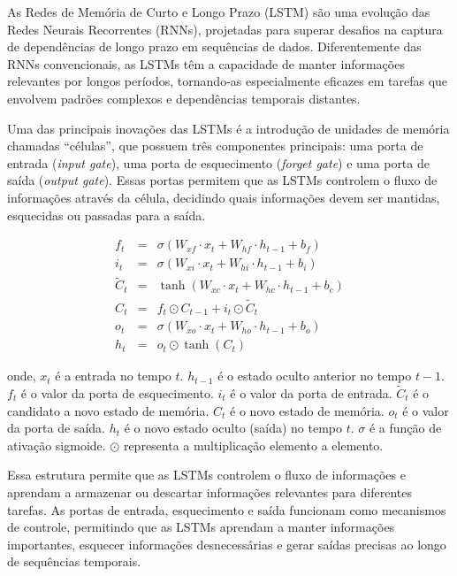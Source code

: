 As Redes de Memória de Curto e Longo Prazo (LSTM) são uma evolução das Redes Neurais Recorrentes (RNNs), projetadas para superar desafios na captura de dependências de longo prazo em sequências de dados. Diferentemente das RNNs convencionais, as LSTMs têm a capacidade de manter informações relevantes por longos períodos, tornando-as especialmente eficazes em tarefas que envolvem padrões complexos e dependências temporais distantes.

Uma das principais inovações das LSTMs é a introdução de unidades de memória chamadas ``células'', que possuem três componentes principais: uma porta de entrada (\textit{input gate}), uma porta de esquecimento (\textit{forget gate}) e uma porta de saída (\textit{output gate}). Essas portas permitem que as LSTMs controlem o fluxo de informações através da célula, decidindo quais informações devem ser mantidas, esquecidas ou passadas para a saída.



\begin{eqnarray}
	f_t &=& \sigma(W_{xf} \cdot x_t + W_{hf} \cdot h_{t-1} + b_f) \\
	i_t &=& \sigma(W_{xi} \cdot x_t + W_{hi} \cdot h_{t-1} + b_i) \\
	\tilde{C}_t &=& \tanh(W_{xc} \cdot x_t + W_{hc} \cdot h_{t-1} + b_c) \\
	C_t &=& f_t \odot C_{t-1} + i_t \odot \tilde{C}_t \\
	o_t &=& \sigma(W_{xo} \cdot x_t + W_{ho} \cdot h_{t-1} + b_o) \\
	h_t &=& o_t \odot \tanh(C_t)
\end{eqnarray}


\noindent onde, \(x_t\) é a entrada no tempo \(t\). \(h_{t-1}\) é o estado oculto anterior no tempo \(t-1\). \(f_t\) é o valor da porta de esquecimento. \(i_t\) é o valor da porta de entrada. \(\tilde{C}_t\) é o candidato a novo estado de memória. \(C_t\) é o novo estado de memória. \(o_t\) é o valor da porta de saída. \(h_t\) é o novo estado oculto (saída) no tempo \(t\). \(\sigma\) é a função de ativação sigmoide. \(\odot\) representa a multiplicação elemento a elemento.

Essa estrutura permite que as LSTMs controlem o fluxo de informações e aprendam a armazenar ou descartar informações relevantes para diferentes tarefas. As portas de entrada, esquecimento e saída funcionam como mecanismos de controle, permitindo que as LSTMs aprendam a manter informações importantes, esquecer informações desnecessárias e gerar saídas precisas ao longo de sequências temporais.


